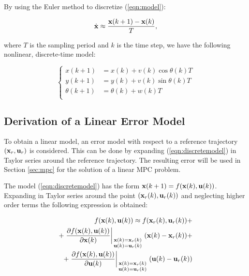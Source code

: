 \documentclass[conference]{IEEEtran} %
\begin{document}
By using the Euler method to discretize (\ref{eqn:model}):

\begin{equation*}
	\dot{\bf x} \approx \frac{{\bf x}(k+1)-{\bf x}(k)}{T},
\end{equation*}

\noindent where $T$ is the sampling period and $k$ is the time step, we have the following nonlinear, discrete-time model:

\begin{equation}
\label{eqn:discretemodel}
	\left\{
		\begin{aligned}
			x(k+1)	    &= x(k) + v(k)\cos\theta(k)T \\
			y(k+1)	    &= y(k) + v(k)\sin\theta(k)T \\
			\theta(k+1) &= \theta(k) + w(k)T \\
		\end{aligned}
	\right.
\end{equation} 

\subsection{Derivation of a Linear Error Model}

To obtain a linear model, an error model with respect to a reference trajectory $({\bf x}_r,{\bf u}_r)$ is considered. This can be done by expanding (\ref{eqn:discretemodel}) in Taylor series around the reference trajectory. The resulting error will be used in Section \ref{sec:mpc} for the solution of a linear MPC problem.

The model (\ref{eqn:discretemodel}) has the form ${\bf x}(k+1)=f({\bf x}(k),{\bf u}(k))$. Expanding in Taylor series around the point $({\bf x}_r(k),{\bf u}_r(k))$ and neglecting higher order terms the following expression is obtained:

\begin{equation}
\begin{split}
\label{eq:taylor}
	f({\bf x}(k),{\bf u}(k)) \approx f({\bf x}_r(k),{\bf u}_r(k)) + \\ + \left.\frac{\partial f({\bf x}(k),{\bf u}(k))}{\partial{\bf x}(k)}\right|_{\begin{smallmatrix}{\bf x}(k)={\bf x}_r(k) \\ {\bf u}(k)={\bf u}_r(k) \end{smallmatrix}}({\bf x}(k)-{\bf x}_r(k)) + \\ + \left.\frac{\partial f({\bf x}(k),{\bf u}(k))}{\partial{\bf u}(k)}\right|_{\begin{smallmatrix}{\bf x}(k)={\bf x}_r(k) \\ {\bf u}(k)={\bf u}_r(k) \end{smallmatrix}}({\bf u}(k)-{\bf u}_r(k))
\end{split}
\end{equation}
\end{document}
